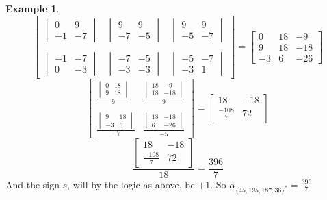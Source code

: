 \documentclass[a4paper,12pt]{book}
\theoremstyle{plain}
\theoremstyle{definition}
\newtheorem{Example}[equation]{Example}
\begin{document}
\begin{Example}
\[\begin{bmatrix}
\begin{vmatrix}
				0 & 9 \\ -1 & -7
			\end{vmatrix} & \begin{vmatrix}
				9 & 9 \\ -7 & -5
			\end{vmatrix} & \begin{vmatrix}
				9 & 9 \\ -5 & -7
			\end{vmatrix} \\ & & \\ \begin{vmatrix}
				-1 & -7 \\ 0 & -3
			\end{vmatrix} & \begin{vmatrix}
				-7 & -5 \\ -3 & -3
			\end{vmatrix} & \begin{vmatrix}
				-5 & -7 \\ -3 & 1
			\end{vmatrix}
		\end{bmatrix} = \begin{bmatrix}
			0 & 18 & -9 \\
			9 & 18 & -18 \\
			-3 & 6 & -26
		\end{bmatrix}
	\]
	\[
		\begin{bmatrix}
			\frac{\begin{vmatrix}
				0 & 18 \\ 9 & 18
			\end{vmatrix}}{9} & \frac{\begin{vmatrix}
				18 & -9 \\ 18 & -18
			\end{vmatrix}}{9} \\ & \\ \frac{\begin{vmatrix}
				9 & 18 \\ -3 & 6
			\end{vmatrix}}{-7} & \frac{\begin{vmatrix}
				18 & -18 \\ 6 & -26
			\end{vmatrix}}{-5}
		\end{bmatrix} = \begin{bmatrix}
			18 & -18 \\ \frac{-108}{7} & 72
		\end{bmatrix}
	\]
	\[
		\frac{\begin{bmatrix}
			18 & -18 \\ \frac{-108}{7} & 72
		\end{bmatrix}}{18} = \frac{396}{7}
	\]
	And the sign \( s \), will by the logic as above, be \( +1 \).
	So \( \alpha_{\{45, 195, 187, 36\}^*} = \frac{396}{7} \)
\end{Example}
\end{document}
